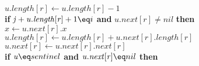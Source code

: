\documentclass{beamer}
\begin{document}
\begin{frame}[shrink]
\begin{oframed}
\begin{flushleft}
\hspace*{1em} \hspace*{1em} \hspace*{1em} \ensuremath{\ensuremath{\mathit{u}}.\ensuremath{\ensuremath{\mathit{length}}[\ensuremath{\mathit{r}}]} \gets  \ensuremath{\ensuremath{\mathit{u}}.\ensuremath{\mathit{length}}[\ensuremath{\mathit{r}}] - 1}}\\
\hspace*{1em} \hspace*{1em} \hspace*{1em} {\color{black} \textbf{if}} \ensuremath{\ensuremath{\mathit{j}} + \ensuremath{\mathit{u}}.\ensuremath{\mathit{length}}[\ensuremath{\mathit{r}}] + 1 \eq i} {\color{black} \textbf{and}} \ensuremath{\ensuremath{\mathit{u}}.\ensuremath{\mathit{next}}[\ensuremath{\mathit{r}}] \ne nil} {\color{black} \textbf{then}} \\
\hspace*{1em} \hspace*{1em} \hspace*{1em} \hspace*{1em} \ensuremath{\ensuremath{\mathit{x}} \gets  \ensuremath{\ensuremath{\mathit{u}}.\ensuremath{\mathit{next}}[\ensuremath{\mathit{r}}].x}}\\
\hspace*{1em} \hspace*{1em} \hspace*{1em} \hspace*{1em} \ensuremath{\ensuremath{\mathit{u}}.\ensuremath{\ensuremath{\mathit{length}}[\ensuremath{\mathit{r}}]} \gets  \ensuremath{\ensuremath{\mathit{u}}.\ensuremath{\mathit{length}}[\ensuremath{\mathit{r}}] + \ensuremath{\mathit{u}}.\ensuremath{\mathit{next}}[\ensuremath{\mathit{r}}].\ensuremath{\mathit{length}}[\ensuremath{\mathit{r}}]}}\\
\hspace*{1em} \hspace*{1em} \hspace*{1em} \hspace*{1em} \ensuremath{\ensuremath{\mathit{u}}.\ensuremath{\ensuremath{\mathit{next}}[\ensuremath{\mathit{r}}]} \gets  \ensuremath{\ensuremath{\mathit{u}}.\ensuremath{\mathit{next}}[\ensuremath{\mathit{r}}].\ensuremath{\mathit{next}}[\ensuremath{\mathit{r}}]}}\\
\hspace*{1em} \hspace*{1em} \hspace*{1em} \hspace*{1em} {\color{black} \textbf{if}} \ensuremath{\ensuremath{\mathit{u}} \eq sentinel} {\color{black} \textbf{and}} \ensuremath{\ensuremath{\mathit{u}}.\ensuremath{\mathit{next}}[\ensuremath{\mathit{r}}] \eq nil} {\color{black} \textbf{then}} \\

\end{flushleft}
\end{oframed}
\end{frame}
\end{document}
